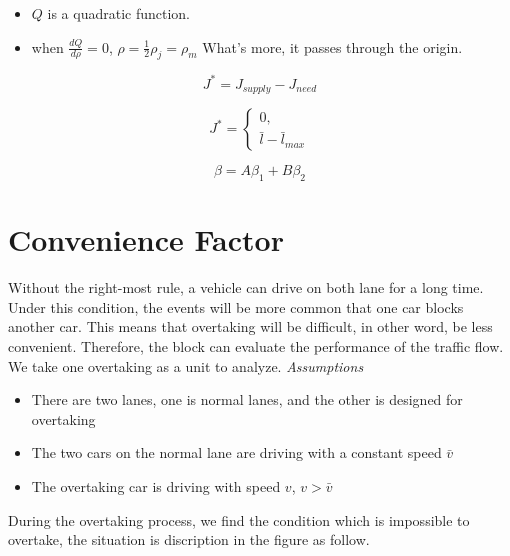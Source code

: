 \begin{itemize}
\item $Q$ is a quadratic function. 
\item when $\frac{dQ}{d \rho} = 0$, 
$\rho = \frac{1}{2}\rho_j = \rho_m $
What's more, it passes through the origin.
\end{itemize}


\begin{equation}
J^* = J_{supply} - J_{need}
\end{equation}

\[ J^* = \begin{cases}
0,\\
\bar{l} - \bar{l}_{max}
\end{cases}\]



\begin{displaymath}
\beta = A\beta_1 + B\beta_2
\end{displaymath}

\section{Convenience Factor}\label{sec: Convenience Factor}
Without the right-most rule, a vehicle can drive on both lane for a long time. Under this condition, the events will be more common that one car blocks another car. This means that overtaking will be difficult,
in other word, be less convenient. Therefore, the block can evaluate the performance of the traffic flow.
We take one overtaking as a unit to
analyze. 
\emph{Assumptions}
\begin{itemize}
\item There are two lanes, one is normal lanes,
and the other is designed for overtaking
\item The two cars on the normal lane are driving
with a constant speed $\bar{v}$
\item The overtaking car is driving with speed
$v$, $v > \bar{v}$
\end{itemize}

During the overtaking
process, we find the condition which
is impossible to overtake, the situation
is discription in the figure as follow.

